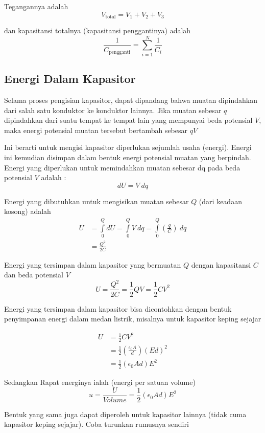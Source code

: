 \documentclass[twocolumn, 11pt]{article}%
\begin{document}
    Tegangannya adalah
    \[V_{\text{total}}=V_1+V_2+V_3\]

    dan kapasitansi totalnya (kapasitansi penggantinya) adalah
    \[\frac1{C_{\text{pengganti}}}=\sum^N_{i=1} \frac1{C_i} \]

    \subsection{Energi Dalam Kapasitor}%
    Selama proses pengisian kapasitor, dapat dipandang bahwa muatan dipindahkan dari salah satu konduktor ke konduktor lainnya. Jika muatan sebesar $q$ dipindahkan dari suatu tempat ke tempat lain yang mempunyai beda potensial $V$, maka energi potensial muatan tersebut bertambah sebesar $qV$

    Ini berarti untuk mengisi kapasitor diperlukan sejumlah usaha (energi). Energi ini kemudian disimpan dalam bentuk energi potensial muatan yang berpindah. Energi yang diperlukan untuk memindahkan muatan sebesar dq pada beda potensial $V$ adalah :
    \[dU=V\ dq\]

    Energi yang dibutuhkan untuk mengisikan muatan sebesar $Q$ (dari keadaan kosong) adalah
    \begin{align*}
        U&=\int\limits_0^Q dU=\int\limits_0^Q V\ dq=\int\limits_0^Q \left(\frac{q}{C}\right)\ dq\\
         &=\frac{Q^2}{2C}
    \end{align*}

    Energi yang tersimpan dalam kapasitor yang bermuatan $Q$ dengan kapasitansi $C$ dan beda potensial $V$
    \[U=\frac{Q^2}{2C}=\frac12 QV=\frac12CV^2 \]

    Energi yang tersimpan dalam kapasitor bisa dicontohkan dengan bentuk penyimpanan energi dalam medan listrik, misalnya untuk kapasitor keping sejajar

    \begin{align*}
        U&=\frac12 CV^2\\
         &=\frac12 \left(\frac{\epsilon_0 A}d\right)(Ed)^2\\
         &=\frac12(\epsilon_0Ad)E^2
    \end{align*}

    Sedangkan Rapat energinya ialah (energi per satuan volume)
    \[u=\frac{U}{Volume}=\frac12 (\epsilon_0Ad) E^2 \]

    Bentuk yang sama juga dapat diperoleh untuk kapasitor lainnya (tidak cuma kapasitor keping sejajar). Coba turunkan rumusnya sendiri
\end{document}
